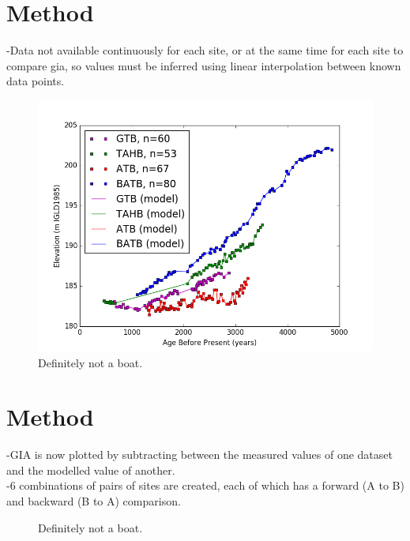 \documentclass{article}
\begin{document}
\section[2]{Method}
-Data not available continuously for each site, or at the same time for each site to compare gia, so values must be inferred using linear interpolation between known data points.\\
\begin{figure}[h]
	\includegraphics[width=\linewidth]{data/theData.png}
	\caption{Definitely not a boat.}
	\label{fig:dataWithModel}
\end{figure}
\newpage
\section[2]{Method}
-GIA is now plotted by subtracting between the measured values of one dataset and the modelled value of another.\\
-6 combinations of pairs of sites are created, each of which has a forward (A to B) and backward (B to A) comparison.\\
\newpage
\begin{figure}[t]
	\caption{Definitely not a boat.}
	\label{fig:data_ATBxBATB}
\end{figure}
\newpage
\end{document}
